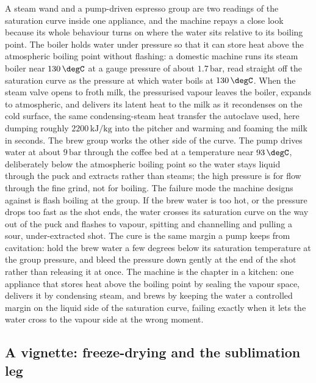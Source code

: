 A steam wand and a pump-driven espresso group are two readings of the
saturation curve inside one appliance, and the machine repays a close look
because its whole behaviour turns on where the water sits relative to its
boiling point. The boiler holds water under pressure so that it can store
heat above the atmospheric boiling point without flashing: a domestic machine
runs its steam boiler near $130\,\degC$ at a gauge pressure of about
$1.7\,\text{bar}$, read straight off the saturation curve as the pressure at
which water boils at $130\,\degC$. When the steam valve opens to froth milk,
the pressurised vapour leaves the boiler, expands to atmospheric, and delivers
its latent heat to the milk as it recondenses on the cold surface, the same
condensing-steam heat transfer the autoclave used, here dumping roughly
$2200\,\text{kJ}/\text{kg}$ into the pitcher and warming and foaming the milk
in seconds. The brew group works the other side of the curve. The pump
drives water at about $9\,\text{bar}$ through the coffee bed at a temperature
near $93\,\degC$, deliberately below the atmospheric boiling point so the
water stays liquid through the puck and extracts rather than steams; the high
pressure is for flow through the fine grind, not for boiling. The failure mode
the machine designs against is flash boiling at the group. If the brew water
is too hot, or the pressure drops too fast as the shot ends, the water crosses
its saturation curve on the way out of the puck and flashes to vapour,
spitting and channelling and pulling a sour, under-extracted shot. The cure is
the same margin a pump keeps from cavitation: hold the brew water a few
degrees below its saturation temperature at the group pressure, and bleed the
pressure down gently at the end of the shot rather than releasing it at once.
The machine is the chapter in a kitchen: one appliance that stores heat above
the boiling point by sealing the vapour space, delivers it by condensing steam,
and brews by keeping the water a controlled margin on the liquid side of the
saturation curve, failing exactly when it lets the water cross to the vapour
side at the wrong moment.

\subsection{A vignette: freeze-drying and the sublimation leg}

